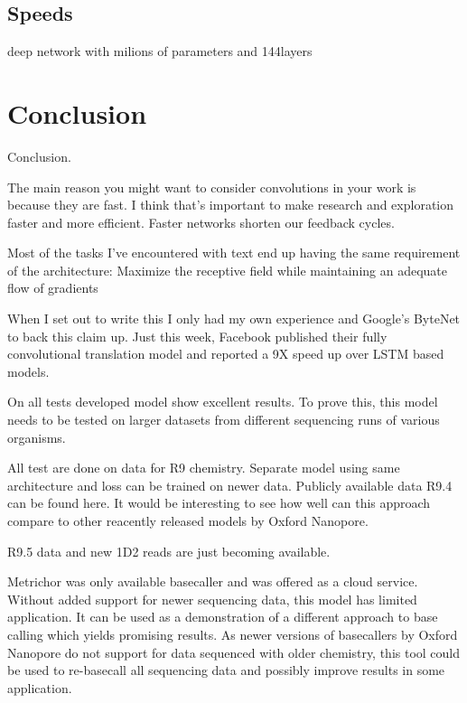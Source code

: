 \documentclass[times, utf8, diplomski, numeric, english]{fer}
\begin{document}
\section{Speeds}
deep network with milions of parameters and 144layers


\chapter{Conclusion}
Conclusion.

The main reason you might want to consider convolutions in your work is because they are fast. I think that’s important to make research and exploration faster and more efficient. Faster networks shorten our feedback cycles.

Most of the tasks I’ve encountered with text end up having the same requirement of the architecture: Maximize the receptive field while maintaining an adequate flow of gradients

When I set out to write this I only had my own experience and Google’s ByteNet to back this claim up. Just this week, Facebook published their fully convolutional translation model and reported a 9X speed up over LSTM based models.






On all tests developed model show excellent results. To prove this, this model needs to be tested on larger datasets from different sequencing runs of various organisms.


All test are done on data for R9 chemistry. Separate model using same architecture and loss can be trained on newer data.  Publicly available data R9.4 can be found here. It would be interesting to see how well can this approach compare to other reacently released models by Oxford Nanopore.

R9.5 data and new 1D2 reads are just becoming available. 


Metrichor was only available basecaller and was offered as a cloud service. Without added support for newer sequencing data, this model has limited application. It can be used as a demonstration of a different approach to base calling which yields promising results. 
As newer versions of basecallers by Oxford Nanopore do not support for data sequenced with older chemistry, this tool could be used to re-basecall all sequencing data and possibly improve results in some application.
\end{document}
